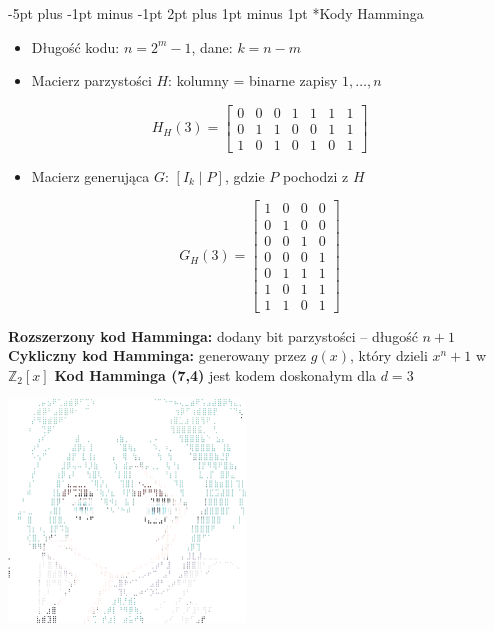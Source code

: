 \documentclass{notatki}
\makeatletter
\renewcommand\section{\@startsection {section}{1}{\z@}%
  {-5pt plus -1pt minus -1pt}%
  {2pt plus 1pt minus 1pt}%
  {\normalfont\large\bfseries}} %
\makeatother
\begin{document}
\begin{multicols}{2}
    \section*{Kody Hamminga}

    \begin{itemize}
      \item Długość kodu: $n = 2^m - 1$, dane: $k = n - m$
      \item Macierz parzystości $H$: kolumny = binarne zapisy $1, \dots, n$
    \end{itemize}
    \vspace{-0.5em}
    \[
    H_H(3) =
    \begin{bmatrix}
    0 & 0 & 0 & 1 & 1 & 1 & 1 \\
    0 & 1 & 1 & 0 & 0 & 1 & 1 \\
    1 & 0 & 1 & 0 & 1 & 0 & 1
    \end{bmatrix}
    \]
    
    \begin{itemize}
      \item Macierz generująca $G$: $[I_k \mid P]$, gdzie $P$ pochodzi z $H$
    \end{itemize}
    \vspace{-0.5em}
    \[
    G_H(3) =
    \begin{bmatrix}
    1 & 0 & 0 & 0 \\
    0 & 1 & 0 & 0 \\
    0 & 0 & 1 & 0 \\
    0 & 0 & 0 & 1 \\
    0 & 1 & 1 & 1 \\
    1 & 0 & 1 & 1 \\
    1 & 1 & 0 & 1
    \end{bmatrix}
    \]

    \textbf{Rozszerzony kod Hamminga:} dodany bit parzystości – długość $n + 1$  
    \textbf{Cykliczny kod Hamminga:} generowany przez $g(x)$, który dzieli $x^n + 1$ w $\mathbb{Z}_2[x]$
\textbf{Kod Hamminga (7,4)} jest kodem doskonałym dla $d = 3$

    \begin{multicols}{2}

    \begin{center}
        \includegraphics[width=17em]{emotionalSupportMiku.png} %
        \vspace{-1em}


\end{center}
\end{multicols}
\end{multicols}
\end{document}
